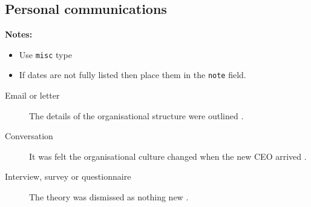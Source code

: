 \subsection{Personal communications}
\textbf{Notes:}\\
\begin{itemize}
\item Use \texttt{misc} type
\item If dates are not fully listed then place them in the \texttt{note} field.
\end{itemize}
\begin{description}
\item[Email or letter] The details of the organisational structure
were outlined \cite{godfrey_restructure_nodate}.
\item[Conversation] It was felt the organisational culture
changed when the new CEO arrived \cite{williams_conversation_nodate}.
\item[Interview, survey or questionnaire] The theory was dismissed as
nothing new \cite{benson_should_nodate}.
\end{description}

